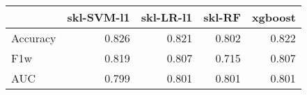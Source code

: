 \begin{tabular}{lrrrr}
\toprule
{} &  skl-SVM-l1 &  skl-LR-l1 &  skl-RF &  xgboost \\
\midrule
Accuracy &       0.826 &      0.821 &   0.802 &    0.822 \\
F1w      &       0.819 &      0.807 &   0.715 &    0.807 \\
AUC      &       0.799 &      0.801 &   0.801 &    0.801 \\
\bottomrule
\end{tabular}
